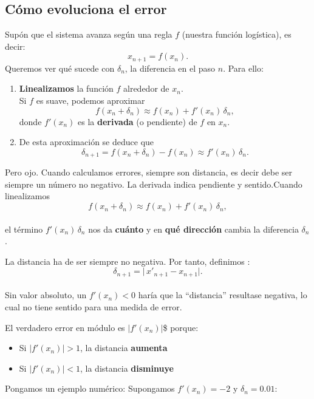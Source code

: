 \documentclass[
  11pt,
  a4paper,
  DIV=11,
  numbers=noendperiod]{scrreprt}
\providecommand{\tightlist}{%
  \setlength{\itemsep}{0pt}\setlength{\parskip}{0pt}}
\begin{document}
\subsection{Cómo evoluciona el error}\label{cuxf3mo-evoluciona-el-error}

Supón que el sistema avanza según una regla \(f\) (nuestra función
logística), es decir: \[
x_{n+1} = f(x_n).
\] Queremos ver qué sucede con \(\delta_n\), la diferencia en el paso
\(n\). Para ello:

\begin{enumerate}
\def\labelenumi{\arabic{enumi}.}
\item
  \textbf{Linealizamos} la función \(f\) alrededor de \(x_n\).\\
  Si \(f\) es suave, podemos aproximar \[
    f(x_n + \delta_n)
    \approx f(x_n)
         + f'(x_n)\,\delta_n,
  \] donde \(f'(x_n)\) es la \textbf{derivada} (o pendiente) de \(f\) en
  \(x_n\).
\item
  De esta aproximación se deduce que \[
    \delta_{n+1} 
    = f(x_n + \delta_n) - f(x_n)
    \approx f'(x_n)\,\delta_n.
  \]
\end{enumerate}

Pero ojo. Cuando calculamos errores, siempre son distancia, es decir
debe ser siempre un número no negativo. La derivada indica pendiente y
sentido.Cuando linealizamos\\
\[
   f(x_n + \delta_n)\approx f(x_n) + f'(x_n)\,\delta_n,
   \]\\
el término \(f'(x_n)\,\delta_n\) nos da \textbf{cuánto} y en \textbf{qué
dirección} cambia la diferencia \(\delta_n\).

La distancia ha de ser siempre no negativa. Por tanto, definimos : \[
   \delta_{n+1} = \bigl|\,x'_{n+1} - x_{n+1}\bigr|.
   \]\\
Sin valor absoluto, un \(f'(x_n)<0\) haría que la ``distancia''
resultase negativa, lo cual no tiene sentido para una medida de error.

El verdadero error en módulo es \(\bigl|f'(x_n)\bigr|\)\$ porque:

\begin{itemize}
\tightlist
\item
  Si \(\lvert f'(x_n)\rvert>1\), la distancia \textbf{aumenta}\\
\item
  Si \(\lvert f'(x_n)\rvert<1\), la distancia \textbf{disminuye}
\end{itemize}

Pongamos un ejemplo numérico: Supongamos \(f'(x_n)=-2\) y
\(\delta_n=0.01\):
\end{document}
